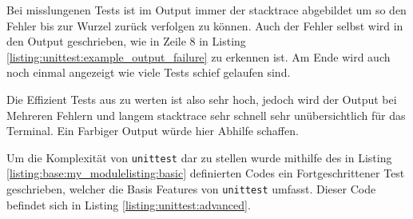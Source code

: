 Bei misslungenen Tests ist im Output immer der \gls{stacktrace} abgebildet um so den Fehler
bis zur Wurzel zurück verfolgen zu können. Auch der Fehler selbst wird in den Output geschrieben,
wie in Zeile 8 in Listing \ref{listing:unittest:example_output_failure} zu erkennen ist. Am
Ende wird auch noch einmal angezeigt wie viele Tests schief gelaufen sind.

Die Effizient Tests aus zu werten ist also sehr hoch, jedoch wird der Output bei Mehreren Fehlern
und langem \gls{stacktrace} sehr schnell sehr unübersichtlich für das Terminal. Ein Farbiger Output
würde hier Abhilfe schaffen.

Um die Komplexität von \lstinline{unittest} dar zu stellen wurde mithilfe des in Listing \ref{listing:base:my_modulelisting:basic} definierten Codes ein Fortgeschrittener Test
geschrieben, welcher die Basis Features von \lstinline{unittest} umfasst. Dieser Code
befindet sich in Listing \ref{listing:unittest:advanced}.